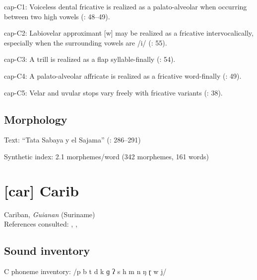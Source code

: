 {\begin{appendixdesc}
\item[cap-C1:] Voiceless dental fricative is realized as a palato-alveolar when occurring between two high vowels (\citealt{Cerrón-Palomino2006}: 48--49).

\item[cap-C2:] Labiovelar approximant [w] may be realized as a fricative intervocalically, especially when the surrounding vowels are /i/ (\citealt{Cerrón-Palomino2006}: 55).

\item[cap-C3:] A trill is realized as a flap syllable-finally (\citealt{Cerrón-Palomino2006}: 54).

\item[cap-C4:] A palato-alveolar affricate is realized as a fricative word-finally (\citealt{Cerrón-Palomino2006}: 49).

\item[cap-C5:] Velar and uvular stops vary freely with fricative variants (\citealt{Cerrón-Palomino2006}: 38).
\end{appendixdesc}
\subsection*{Morphology}

\begin{appendixdesc}

\item[Text:] “Tata Sabaya y el Sajama” (\citealt{Cerrón-Palomino2006}: 286--291)

\item[Synthetic index:] 2.1 morphemes/word (342 morphemes, 161 words)
\end{appendixdesc}
\section*{[car] Carib}   %
Cariban, \textit{Guianan} (Suriname)\medskip\\
References consulted: \citet{Courtz2008}, \citet{Hoff1968}, \citet{Peasgood1972}

\subsection*{Sound inventory}
\begin{appendixdesc}

\item[C phoneme inventory:] /p b t d k ɡ ʔ s h m n ŋ ɽ w j/


\end{appendixdesc}}
